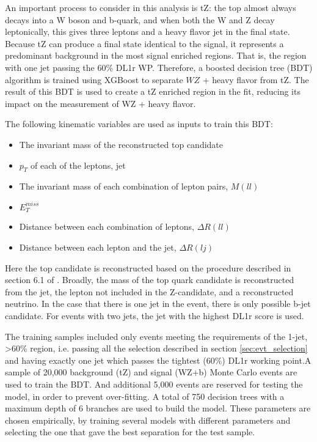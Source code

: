 

An important process to consider in this analysis is tZ: the top almost always decays into a W boson and b-quark, and when both the W and Z decay leptonically, this gives three leptons and a heavy flavor jet in the final state. Because tZ can produce a final state identical to the signal, it represents a predominant background in the most signal enriched regions. That is, the region with one jet passing the 60\% DL1r WP. Therefore, a boosted decision tree (BDT) algorithm is trained using XGBoost \cite{xgboost_cite} to separate $WZ$ + heavy flavor from tZ. The result of this BDT is used to create a tZ enriched region in the fit, reducing its impact on the measurement of WZ + heavy flavor.

The following kinematic variables are used as inputs to train this BDT:
 
\begin{itemize}
     \item The invariant mass of the reconstructed top candidate
     \item $p_T$ of each of the leptons, jet
     \item The  invariant mass of each combination of lepton pairs, $M(ll)$
     \item $E_T^{miss}$
     \item Distance between each combination of leptons, $\Delta R (ll)$
     \item Distance between each lepton and the jet, $\Delta R (lj)$
\end{itemize}


Here the top candidate is reconstructed based on the procedure described in section 6.1 of \cite{ttZ_paper}. Broadly, the mass of the top quark candidate is reconstructed from the jet, the lepton not included in the Z-candidate, and a reconstructed neutrino. In the case that there is one jet in the event, there is only possible b-jet candidate. For events with two jets, the jet with the highest DL1r score is used.
 
The training samples included only events meeting the requirements of the 1-jet, >60\% region, i.e. passing all the selection described in section \ref{sec:evt_selection} and having exactly one jet which passes the tightest (60\%) DL1r working point.A sample of 20,000 background (tZ) and signal (WZ+b) Monte Carlo events are used to train the BDT. And additional 5,000 events are reserved for testing the model, in order to prevent over-fitting. A total of 750 decision trees with a maximum depth of 6 branches are used to build the model. These parameters are chosen empirically, by training several models with different parameters and selecting the one that gave the best separation for the test sample. 

